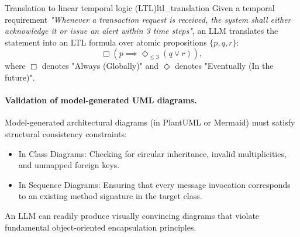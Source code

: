 \documentclass[../../main.tex]{subfiles}
\begin{document}
\begin{definition}{Translation to linear temporal logic (LTL)}{ltl_translation}
Given a temporal requirement \emph{"Whenever a transaction request is received, the system shall either acknowledge it or issue an alert within 3 time steps"}, an LLM translates the statement into an LTL formula over atomic propositions $\{p, q, r\}$:
\begin{equation}
\label{eq:ltl_spec}
\Box \left( p \implies \Diamond_{\le 3} (q \lor r) \right),
\end{equation}
where $\Box$ denotes "Always (Globally)" and $\Diamond$ denotes "Eventually (In the future)".
\end{definition}

\paragraph{Validation of model-generated UML diagrams.}
Model-generated architectural diagrams (in PlantUML or Mermaid) must satisfy structural consistency constraints:
\begin{itemize}
    \item In Class Diagrams: Checking for circular inheritance, invalid multiplicities, and unmapped foreign keys.
    \item In Sequence Diagrams: Ensuring that every message invocation corresponds to an existing method signature in the target class.
\end{itemize}
An LLM can readily produce visually convincing diagrams that violate fundamental object-oriented encapsulation principles.
\end{document}
